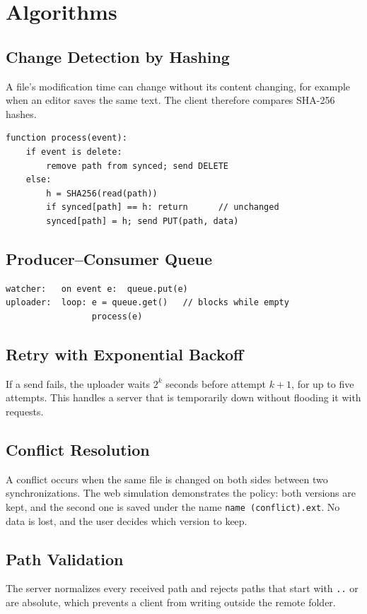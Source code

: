 \documentclass[12pt,a4paper]{article}
\begin{document}
\section{Algorithms}
\subsection{Change Detection by Hashing}
A file's modification time can change without its content changing, for example when an editor saves the same text. The client therefore compares SHA-256 hashes.

\begin{lstlisting}
function process(event):
    if event is delete:
        remove path from synced; send DELETE
    else:
        h = SHA256(read(path))
        if synced[path] == h: return      // unchanged
        synced[path] = h; send PUT(path, data)
\end{lstlisting}

\subsection{Producer--Consumer Queue}
\begin{lstlisting}
watcher:   on event e:  queue.put(e)
uploader:  loop: e = queue.get()   // blocks while empty
                 process(e)
\end{lstlisting}

\subsection{Retry with Exponential Backoff}
If a send fails, the uploader waits $2^{k}$ seconds before attempt $k+1$, for up to five attempts. This handles a server that is temporarily down without flooding it with requests.

\subsection{Conflict Resolution}
A conflict occurs when the same file is changed on both sides between two synchronizations. The web simulation demonstrates the policy: both versions are kept, and the second one is saved under the name \texttt{name (conflict).ext}. No data is lost, and the user decides which version to keep.

\subsection{Path Validation}
The server normalizes every received path and rejects paths that start with \texttt{..} or are absolute, which prevents a client from writing outside the remote folder.
\end{document}
